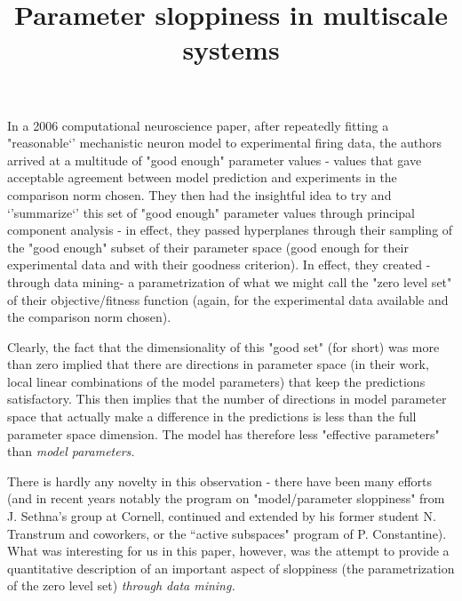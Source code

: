 \documentclass{article}
\title{Parameter sloppiness in multiscale systems}
\author{}
\begin{document}
\maketitle

In a 2006 computational neuroscience paper, after repeatedly fitting a "reasonable`' mechanistic neuron model to experimental firing data, the authors arrived at a multitude of "good enough" parameter values - values that gave acceptable agreement between model prediction and experiments in the comparison norm chosen. They then had the insightful idea to try and `'summarize`' this set of "good enough" parameter values through principal component analysis - in effect, they passed hyperplanes through their sampling of the "good enough" subset of their parameter space (good enough
for their experimental data and with their goodness criterion).
%
In effect, they created -through data mining- a parametrization of what we might call the "zero level set" of their objective/fitness function (again, for the experimental data available and the comparison norm chosen).

Clearly, the fact that the dimensionality of this "good set" (for short) was more than zero implied that there are
directions in parameter space (in their work, local linear combinations of the model parameters) that keep the
predictions satisfactory.
%
This then implies that the number of directions in model parameter space that actually make a difference in the predictions is less than the full parameter space dimension.
%
The model has therefore less "effective parameters" than \em{model parameters}.

There is hardly any novelty in this observation - there have been many efforts (and in recent years notably the program on "model/parameter sloppiness" from J. Sethna's group at Cornell, continued and extended by his former student
N. Transtrum and coworkers, or the ``active subspaces" program of P. Constantine).
%
What was interesting for us in this paper, however, was the attempt to provide a quantitative description of an important aspect of sloppiness (the parametrization of the zero level set) \em{through data mining}.
\end{document}
